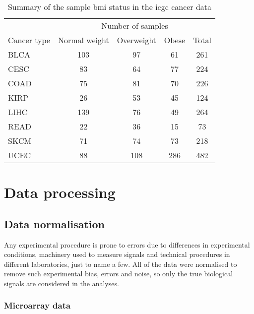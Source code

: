 \begin{table}[htpb]
	\caption{Summary of the sample \gls{bmi} status in the \gls{icgc} cancer data}
	\label{tab:icgc_bmi}
	\begin{center}
		\begin{tabular}{lcccc}
			& \multicolumn{4}{c}{Number of samples}\\
			\cmidrule(r){2-5}
			Cancer type & Normal weight & Overweight & Obese & Total\\
			\hline
			\hline
			\rule{0pt}{2.25ex}BLCA & 103 & 97  & 61  & 261 \\
			CESC                   & 83  & 64  & 77  & 224 \\
			COAD                   & 75  & 81  & 70  & 226 \\
			KIRP                   & 26  & 53  & 45  & 124 \\
			LIHC                   & 139 & 76  & 49  & 264 \\
			READ                   & 22  & 36  & 15  & 73  \\
			SKCM                   & 71  & 74  & 73  & 218 \\
			UCEC                   & 88  & 108 & 286 & 482 \\
			\hline
			\hline
		\end{tabular}
	\end{center}
\end{table}

\section{Data processing}
\label{sec:datproc}

\subsection{Data normalisation}
\label{sub:data_normalisation}

Any experimental procedure is prone to errors due to differences in experimental conditions, machinery used to measure signals and technical procedures in different laboratories, just to name a few.
All of the data were normalised to remove such experimental bias, errors and noise, so only the true biological signals are considered in the analyses.

\subsubsection{Microarray data}
\label{ssub:microarray_data}


